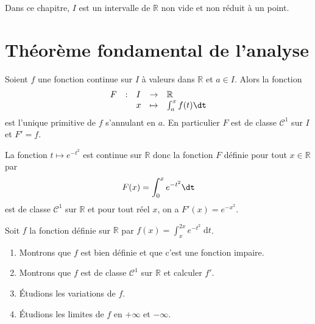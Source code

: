 \documentclass[a4paper,10pt]{report}
\begin{document}


Dans ce chapitre, $I$ est un intervalle de $\mathbb{R}$ non vide et non réduit à un point.
\section{Théorème fondamental de l'analyse}

\begin{Theoreme}{} Soient $f$ une fonction continue sur $I$ à valeurs dans $\mathbb{R}$ et $a \in I$. Alors la fonction 
$$ \begin{array}{cllll}
F & : & I & \rightarrow & \mathbb{R} \\
 & & x & \mapsto & \int_{a}^x f(t) \dt \\
\end{array}$$
est l'unique primitive de $f$ s'annulant en $a$. En particulier $F$ est de classe $\mathcal{C}^1$ sur $I$ et $F'=f$.
\end{Theoreme} 

\begin{Exemple} La fonction $t \mapsto e^{-t^2}$ est continue sur $\mathbb{R}$ donc la fonction $F$ définie pour tout $x \in \mathbb{R}$ par 
$$ F(x) = \int_{0}^x e^{-t^2} \dt$$
est de classe $\mathcal{C}^1$ sur $\mathbb{R}$ et pour tout réel $x$, on a $F'(x)=e^{-x^2}$.
\end{Exemple}

\medskip

\begin{Exemple} Soit $f$ la fonction définie sur $\mathbb{R}$ par $\displaystyle{f(x)=\int_x^{2x} e^{-t^2}\;\text{d}t}$.
\begin{enumerate}
\item Montrons que $f$ est bien définie et que c'est une fonction impaire.

\vspace{5cm}
\item Montrons que $f$ est de classe $\mathcal{C}^1$ sur $\mathbb{R}$ et calculer $f'$.

\vspace{5cm}

\item Étudions les variations de $f$.

\vspace{5cm}
\newpage

\item Étudions les limites de $f$ en $+ \infty$ et $- \infty$.

\vspace{7cm}
\end{enumerate}
\end{Exemple}
\end{document}
